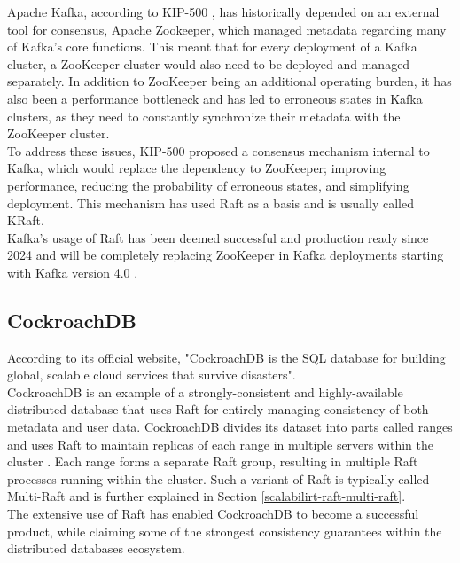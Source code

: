 Apache Kafka, according to KIP-500 \cite{kip-500}, has historically depended on an external tool for consensus, Apache Zookeeper, which managed metadata regarding many of Kafka's core functions. This meant that for every deployment of a Kafka cluster, a ZooKeeper cluster would also need to be deployed and managed separately. In addition to ZooKeeper being an additional operating burden, it has also been a performance bottleneck and has led to erroneous states in Kafka clusters, as they need to constantly synchronize their metadata with the ZooKeeper cluster\cite{kip-500}.\\

To address these issues, KIP-500 proposed a consensus mechanism internal to Kafka, which would replace the dependency to ZooKeeper; improving performance, reducing the probability of erroneous states, and simplifying deployment. This mechanism has used Raft as a basis and is usually called KRaft.\\

Kafka's usage of Raft has been deemed successful and production ready since 2024 and will be completely replacing ZooKeeper in Kafka deployments starting with Kafka version 4.0 \cite{kip-833}.

\subsection{CockroachDB}

According to its official website, "CockroachDB is the SQL database for building global, scalable cloud services that survive disasters"\cite{cockroach-db}.\\

CockroachDB is an example of a strongly-consistent and highly-available distributed database that uses Raft for entirely managing consistency of both metadata and user data. CockroachDB divides its dataset into parts called ranges and uses Raft to maintain replicas of each range in multiple servers within the cluster \cite{cockroach-db}. Each range forms a separate Raft group, resulting in multiple Raft processes running within the cluster. Such a variant of Raft is typically called Multi-Raft and is further explained in Section \ref{scalabilirt-raft-multi-raft}.\\

The extensive use of Raft has enabled CockroachDB to become a successful product, while claiming some of the strongest consistency guarantees within the distributed databases ecosystem.


